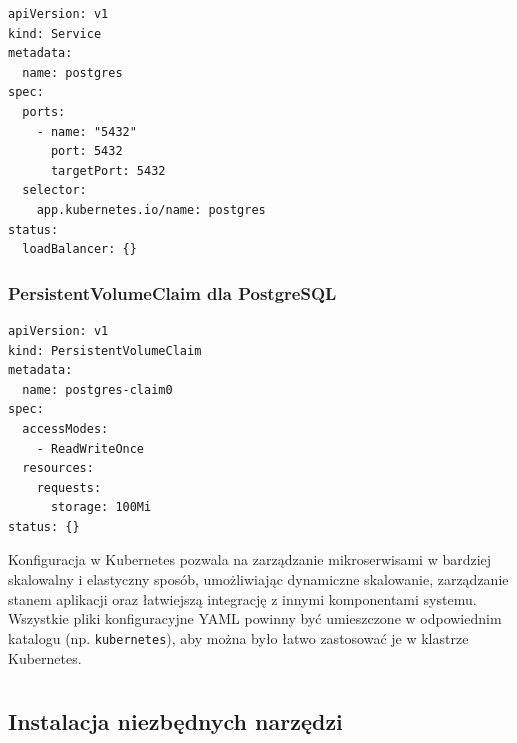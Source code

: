 \documentclass[polish]{aghengthesis}
\begin{document}
\begin{lstlisting}[caption=Service dla PostgreSQL]
apiVersion: v1
kind: Service
metadata:
  name: postgres
spec:
  ports:
    - name: "5432"
      port: 5432
      targetPort: 5432
  selector:
    app.kubernetes.io/name: postgres
status:
  loadBalancer: {}
\end{lstlisting}

\subsection{PersistentVolumeClaim dla PostgreSQL}

\begin{lstlisting}[caption=PersistentVolumeClaim dla PostgreSQL]
apiVersion: v1
kind: PersistentVolumeClaim
metadata:
  name: postgres-claim0
spec:
  accessModes:
    - ReadWriteOnce
  resources:
    requests:
      storage: 100Mi
status: {}
\end{lstlisting}

Konfiguracja w Kubernetes pozwala na zarządzanie mikroserwisami w bardziej skalowalny i elastyczny sposób, umożliwiając dynamiczne skalowanie, zarządzanie stanem aplikacji oraz łatwiejszą integrację z innymi komponentami systemu. Wszystkie pliki konfiguracyjne YAML powinny być umieszczone w odpowiednim katalogu (np. \texttt{kubernetes}), aby można było łatwo zastosować je w klastrze Kubernetes.

\chapter{\ChapterTitleInstallMethod}
\label{sec:instalacja}

\section{Instalacja niezbędnych narzędzi}
\end{document}
